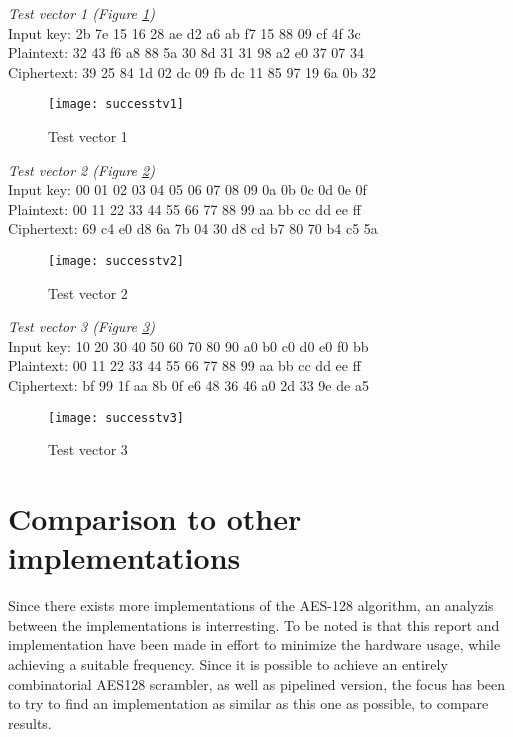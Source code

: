 \emph{Test vector 1 (Figure \ref{test:1})}\\
Input key: 2b 7e 15 16 28 ae d2 a6 ab f7 15 88 09 cf 4f 3c\\
Plaintext: 32 43 f6 a8 88 5a 30 8d 31 31 98 a2 e0 37 07 34\\
Ciphertext: 39 25 84 1d 02 dc 09 fb dc 11 85 97 19 6a 0b 32

\begin{figure}
  \texttt{[image: successtv1]}
  \caption{Test vector 1}
  \label{test:1}
\end{figure}

\emph{Test vector 2 (Figure \ref{test:2})}\\
Input key: 00 01 02 03 04 05 06 07 08 09 0a 0b 0c 0d 0e 0f\\
Plaintext: 00 11 22 33 44 55 66 77 88 99 aa bb cc dd ee ff\\
Ciphertext: 69 c4 e0 d8 6a 7b 04 30 d8 cd b7 80 70 b4 c5 5a

\begin{figure}
  \texttt{[image: successtv2]}
  \caption{Test vector 2}
  \label{test:2}
\end{figure}

\emph{Test vector 3 (Figure \ref{test:3})} \\
Input key: 10 20 30 40 50 60 70 80 90 a0 b0 c0 d0 e0 f0 bb\\
Plaintext: 00 11 22 33 44 55 66 77 88 99 aa bb cc dd ee ff\\
Ciphertext: bf 99 1f aa 8b 0f e6 48 36 46 a0 2d 33 9e de a5

\begin{figure}
  \texttt{[image: successtv3]}
  \caption{Test vector 3}
  \label{test:3}
\end{figure}

\section{Comparison to other implementations}
Since there exists more implementations of the AES-128 algorithm, an 
analyzis between the implementations is interresting. To be noted is 
that this report and implementation have been made in effort to 
minimize the hardware usage, while achieving a suitable frequency.
Since it is possible to achieve an entirely combinatorial AES128 
scrambler, as well as pipelined version, the focus has been to try to 
find an implementation as similar as this one as possible, to compare 
results. 


